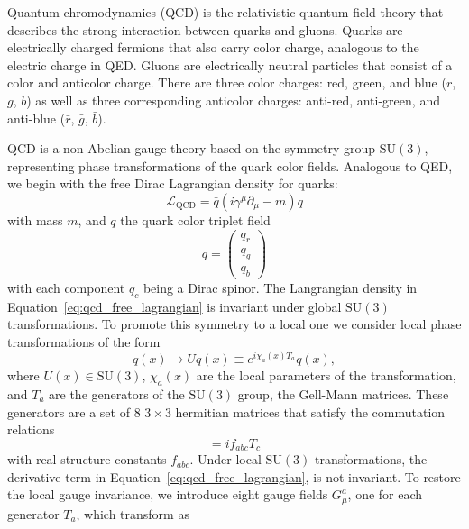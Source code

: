 Quantum chromodynamics (QCD) is the relativistic quantum field theory that describes the strong interaction between quarks and gluons. Quarks are electrically charged fermions that also carry color charge, analogous to the electric charge in QED\@. Gluons are electrically neutral particles that consist of a color and anticolor charge. There are three color charges: red, green, and blue ($r$, $g$, $b$) as well as three corresponding anticolor charges: anti-red, anti-green, and anti-blue ($\bar{r}$, $\bar{g}$, $\bar{b}$). 

QCD is a non-Abelian gauge theory based on the symmetry group $\mathrm{SU}(3)$, representing phase transformations of the quark color fields. Analogous to QED, we begin with the free Dirac Lagrangian density for quarks:
\begin{equation}
  \mathcal{L}_{\mathrm{QCD}} = \bar{q}(i\gamma^{\mu}\partial_{\mu} - m)q
  \label{eq:qcd_free_lagrangian}
\end{equation}
with mass $m$, and $q$ the quark color triplet field
\begin{equation}
  q = \begin{pmatrix}
    q_{r} \\
    q_{g} \\
    q_{b}
  \end{pmatrix}
  \label{eq:qcd_quark_field}
\end{equation}
with each component $q_{c}$ being a Dirac spinor. The Langrangian density in Equation~\ref{eq:qcd_free_lagrangian} is invariant under global $\mathrm{SU}(3)$ transformations. To promote this symmetry to a local one we consider local phase transformations of the form
\begin{equation}
  q(x) \to Uq(x) \equiv e^{i\chi_{a}(x)T_{a}}q(x),
  \label{eq:qcd_local_symmetry}
\end{equation}
where $U(x) \in \mathrm{SU}(3)$, $\chi_{a}(x)$ are the local parameters of the transformation, and $T_{a}$ are the generators of the $\mathrm{SU}(3)$ group, the Gell-Mann matrices. These generators are a set of $8$ $3 \times 3$ hermitian matrices that satisfy the commutation relations
\begin{equation}
  [T_{a}, T_{b}] = i f_{abc}T_{c}
  \label{eq:qcd_commutation_relation}
\end{equation}
with real structure constants $f_{abc}$. Under local $\mathrm{SU}(3)$ transformations, the derivative term in Equation~\ref{eq:qcd_free_lagrangian}, is not invariant. To restore the local gauge invariance, we introduce eight gauge fields $G_{\mu}^{a}$, one for each generator $T_{a}$, which transform as
